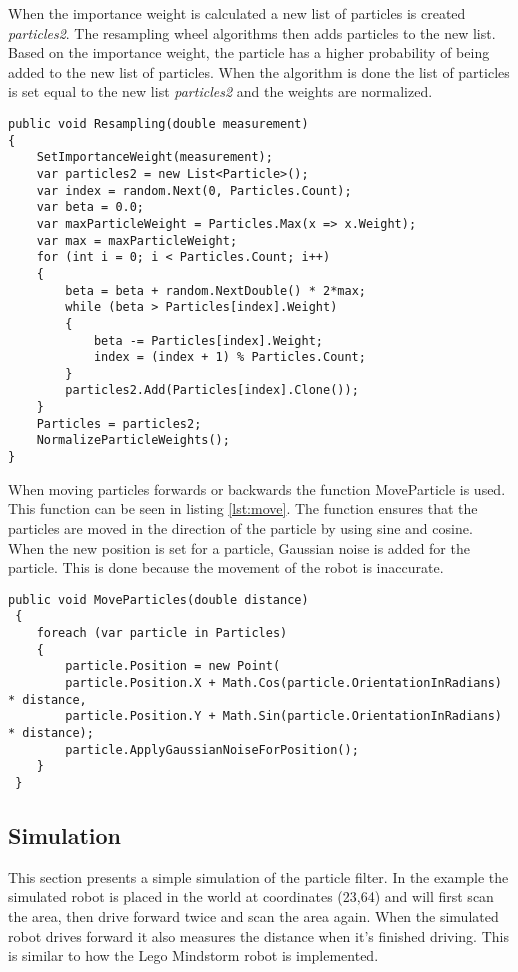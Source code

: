 When the importance weight is calculated a new list of particles is created \emph{particles2}. The resampling wheel algorithms then adds particles to the new list. Based on the importance weight, the particle has a higher probability of being added to the new list of particles. When the algorithm is done the list of particles is set equal to the new list \emph{particles2} and the weights are normalized.

\lstset{style=sharpc}
\begin{lstlisting}[caption={Resampling wheel}, label=lst:wheel, mathescape=true]                          
public void Resampling(double measurement)
{
	SetImportanceWeight(measurement);
	var particles2 = new List<Particle>();
	var index = random.Next(0, Particles.Count);
	var beta = 0.0;
	var maxParticleWeight = Particles.Max(x => x.Weight);
	var max = maxParticleWeight;
	for (int i = 0; i < Particles.Count; i++)
	{
		beta = beta + random.NextDouble() * 2*max;
		while (beta > Particles[index].Weight)
		{
			beta -= Particles[index].Weight;
			index = (index + 1) % Particles.Count;
		}
		particles2.Add(Particles[index].Clone());
	}
	Particles = particles2;
	NormalizeParticleWeights();
}
\end{lstlisting}

When moving particles forwards or backwards the function MoveParticle is used. This function can be seen in listing \ref{lst:move}. The function ensures that the particles are moved in the direction of the particle by using sine and cosine. When the new position is set for a particle, Gaussian noise is added for the particle. This is done because the movement of the robot is inaccurate. 

\lstset{style=sharpc}
\begin{lstlisting}[caption={Resampling wheel}, label=lst:move,  basicstyle=\tiny, mathescape=true]        
public void MoveParticles(double distance)
 {
 	foreach (var particle in Particles)
 	{
 		particle.Position = new Point(
 		particle.Position.X + Math.Cos(particle.OrientationInRadians) * distance, 
 		particle.Position.Y + Math.Sin(particle.OrientationInRadians) * distance); 
 		particle.ApplyGaussianNoiseForPosition();
 	}
 }
\end{lstlisting}

\subsection{Simulation}
This section presents a simple simulation of the particle filter. In the example the simulated robot is placed in the world at coordinates (23,64) and will first scan the area, then drive forward twice and scan the area again. When the simulated robot drives forward it also measures the distance when it's finished driving. This is similar to how the Lego Mindstorm robot is implemented.

